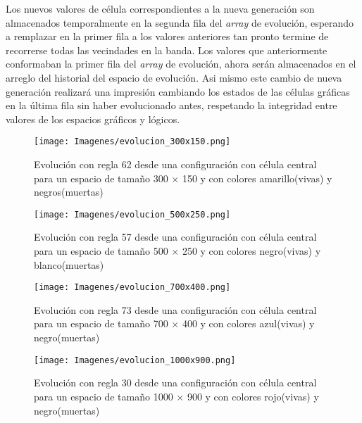 \documentclass[]{article}
\begin{document}
				\hfill\break
				\justifying
				Los nuevos valores de célula correspondientes a la nueva generación son almacenados temporalmente en la segunda fila del \textit{array} de evolución, esperando a remplazar en la primer fila a los valores anteriores tan pronto termine de recorrerse todas las vecindades en la banda.
				Los valores que anteriormente conformaban la primer fila del \textit{array} de evolución, ahora serán almacenados en el arreglo del historial del espacio de evolución. Asi mismo este cambio de nueva generación realizará una impresión cambiando los estados de las células gráficas en la última fila sin haber evolucionado antes, respetando la integridad entre valores de los espacios gráficos y lógicos.
				
				\begin{landscape}
					
					\hfill\break
					\hfill\break
					\hfill\break
					\hfill\break
					\hfill\break
					
						\begin{figure}[!h]
							\centering
							\texttt{[image: Imagenes/evolucion\_300x150.png]}
							\caption{Evolución con regla 62 desde una configuración con célula central para un espacio de tamaño 300 $\times$ 150 y con colores amarillo(vivas) y negros(muertas)}
							\label{Evolucion_1}
						\end{figure}
				
					\newpage
					
					\hfill\break
					\hfill\break
					\hfill\break
					\hfill\break
					\hfill\break
					
						\begin{figure}[!h]
							\centering
							\texttt{[image: Imagenes/evolucion\_500x250.png]}
							\caption{Evolución con regla 57 desde una configuración con célula central para un espacio de tamaño 500 $\times$ 250 y con colores negro(vivas) y blanco(muertas)}
							\label{Evolucion_2}
						\end{figure}
				
					\newpage
		
					\hfill\break
					\hfill\break
					\hfill\break
					
						\begin{figure}[!h]
						\centering
						\texttt{[image: Imagenes/evolucion\_700x400.png]}
						\caption{Evolución con regla 73 desde una configuración con célula central para un espacio de tamaño 700 $\times$ 400 y con colores azul(vivas) y negro(muertas)}
						\label{Evolucion_3}
						\end{figure}
					
					\newpage
						\begin{figure}[!h]
						\centering
						\texttt{[image: Imagenes/evolucion\_1000x900.png]}
						\caption{Evolución con regla 30 desde una configuración con célula central para un espacio de tamaño 1000 $\times$ 900 y con colores rojo(vivas) y negro(muertas)}
						\label{Evolucion_4}
						\end{figure}
					
				\end{landscape}
			
\end{document}
